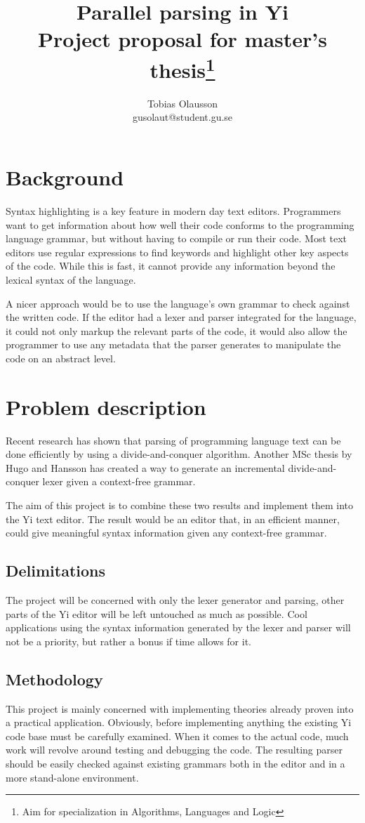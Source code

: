 \documentclass[a4paper,12pt]{article}
\title{Parallel parsing in Yi \\ 
       \small{Project proposal for master's thesis}\thanks{Aim for 
              specialization in Algorithms, Languages and Logic}}
\author{Tobias Olausson \\ \small{gusolaut@student.gu.se}}
\date{}
\begin{document}
\maketitle

\section*{Background}
Syntax highlighting is a key feature in modern day text editors. Programmers
want to get information about how well their code conforms to the programming
language grammar, but without having to compile or run their code. Most text
editors use regular expressions to find keywords and highlight other key aspects
of the code. While this is fast, it cannot provide any information beyond the
lexical syntax of the language.

A nicer approach would be to use the language's own grammar to check against the
written code. If the editor had a lexer and parser integrated for the language,
it could not only markup the relevant parts of the code, it would also allow the
programmer to use any metadata that the parser generates to manipulate the code
on an abstract level.

\section*{Problem description}
Recent research has shown that parsing of programming language text can be done
efficiently by using a divide-and-conquer algorithm\cite{parparsepaper}. Another
MSc thesis by Hugo and Hansson has created a way to generate an incremental
divide-and-conquer lexer given a context-free grammar\cite{hugohansson}.

The aim of this project is to combine these two results and implement them into
the Yi text editor\cite{yieditor}. The result would be an editor that, in an
efficient manner, could give meaningful syntax information given any
context-free grammar.

\subsection*{Delimitations}
The project will be concerned with only the lexer generator and parsing, other
parts of the Yi editor will be left untouched as much as possible. Cool
applications using the syntax information generated by the lexer and parser will
not be a priority, but rather a bonus if time allows for it.

\subsection*{Methodology}
This project is mainly concerned with implementing theories already proven into
a practical application. Obviously, before implementing anything the existing Yi
code base must be carefully examined. When it comes to the actual code, much
work will revolve around testing and debugging the code. The resulting parser
should be easily checked against existing grammars both in the editor and in a
more stand-alone environment.
\end{document}
